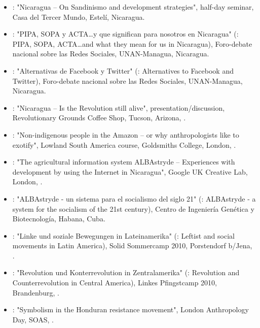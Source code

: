 \begin{itemize}
\item {}: "Nicaragua – On Sandinismo and development strategies", half-day seminar, Casa del Tercer Mundo, Estelí, Nicaragua.

\item {}: "PIPA, SOPA y ACTA\ldots y que significan para nosotros en Nicaragua" (\english: PIPA, SOPA, ACTA\ldots and what they mean for us in Nicaragua), Foro-debate nacional sobre las Redes Sociales, UNAN-Managua, Nicaragua.

\item {}: "Alternativas de Facebook y Twitter" (\english: Alternatives to Facebook and Twitter), Foro-debate nacional sobre las Redes Sociales, UNAN-Managua, Nicaragua.

\item {}: "Nicaragua – Is the Revolution still alive", presentation/discussion, Revolutionary Grounds Coffee Shop, Tucson, Arizona, \USA.

\item {}: "Non-indigenous people in the Amazon – or why anthropologists like to exotify", Lowland South America course, Goldsmiths College, London, \UK.

\item {}: "The agricultural information system ALBAstryde – Experiences with development by using the Internet in Nicaragua", Google UK Creative Lab, London, \UK.

\item {}: "ALBAstryde - un sistema para el socialismo del siglo 21" (\english: ALBAstryde - a system for the socialism of the 21st century), Centro de Ingeniería Genética y Biotecnología, Habana, Cuba.

\item {}: "Linke und soziale Bewegungen in Lateinamerika" (\english: Leftist and social movements in Latin America), Solid Sommercamp 2010, Porstendorf b/Jena, \Germany.

\item {}: "Revolution und Konterrevolution in Zentralamerika" (\english: Revolution and Counterrevolution in Central America), Linkes Pfingstcamp 2010, Brandenburg, \Germany.

\item {}: "Symbolism in the Honduran resistance movement", London Anthropology Day, SOAS, \UK.


\end{itemize}
